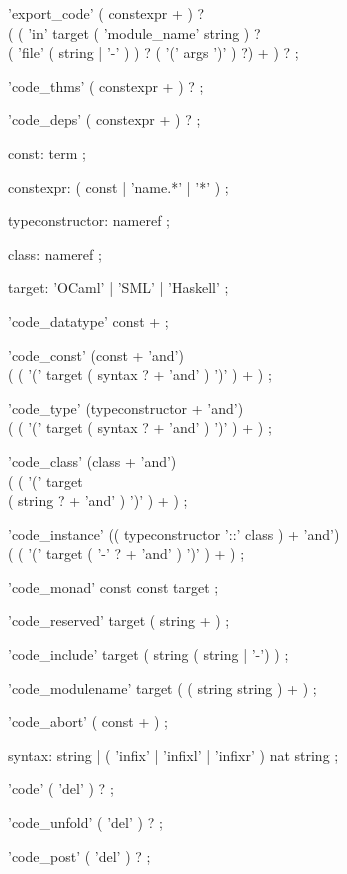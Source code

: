 \begin{isabellebody}
\begin{isamarkuptext}
  \begin{rail}
    'export\_code' ( constexpr + ) ? \\
      ( ( 'in' target ( 'module\_name' string ) ? \\
        ( 'file' ( string | '-' ) ) ? ( '(' args ')' ) ?) + ) ?
    ;

    'code\_thms' ( constexpr + ) ?
    ;

    'code\_deps' ( constexpr + ) ?
    ;

    const: term
    ;

    constexpr: ( const | 'name.*' | '*' )
    ;

    typeconstructor: nameref
    ;

    class: nameref
    ;

    target: 'OCaml' | 'SML' | 'Haskell'
    ;

    'code\_datatype' const +
    ;

    'code\_const' (const + 'and') \\
      ( ( '(' target ( syntax ? + 'and' ) ')' ) + )
    ;

    'code\_type' (typeconstructor + 'and') \\
      ( ( '(' target ( syntax ? + 'and' ) ')' ) + )
    ;

    'code\_class' (class + 'and') \\
      ( ( '(' target \\ ( string ? + 'and' ) ')' ) + )
    ;

    'code\_instance' (( typeconstructor '::' class ) + 'and') \\
      ( ( '(' target ( '-' ? + 'and' ) ')' ) + )
    ;

    'code\_monad' const const target
    ;

    'code\_reserved' target ( string + )
    ;

    'code\_include' target ( string ( string | '-') )
    ;

    'code\_modulename' target ( ( string string ) + )
    ;

    'code\_abort' ( const + )
    ;

    syntax: string | ( 'infix' | 'infixl' | 'infixr' ) nat string
    ;

    'code' ( 'del' ) ?
    ;

    'code_unfold' ( 'del' ) ?
    ;

    'code_post' ( 'del' ) ?
    ;
  \end{rail}

  \begin{description}


\end{description}
\end{isamarkuptext}
\end{isabellebody}
